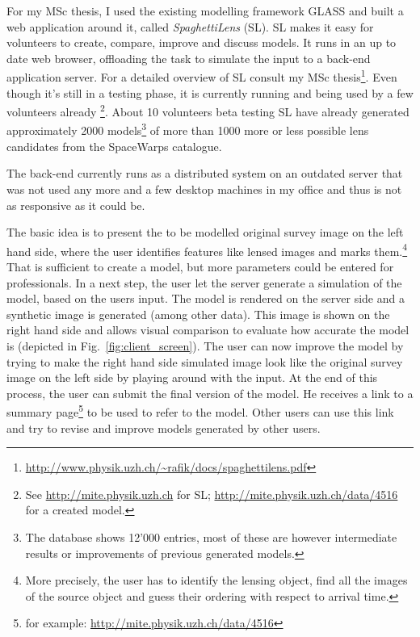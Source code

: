 \documentclass[11pt]{article}
\begin{document}
For my MSc thesis\cite{mscth}, I used the existing modelling framework GLASS\cite{glass} and built a web application around it, called \emph{SpaghettiLens} (SL).
SL makes it easy for volunteers to create, compare, improve and discuss models.
It runs in an up to date web browser, offloading the task to simulate the input to a back-end application server.
For a detailed overview of SL consult my MSc thesis\footnote{\url{http://www.physik.uzh.ch/~rafik/docs/spaghettilens.pdf}}.
Even though it's still in a testing phase, it is currently running and being used by a few volunteers already
\footnote{See \url{http://mite.physik.uzh.ch} for SL; \url{http://mite.physik.uzh.ch/data/4516} for a created model.}.
About 10 volunteers beta testing SL have already generated approximately 2000 models\footnote{The database shows 12'000 entries, most of these are however intermediate results or improvements of previous generated models.} of more than 1000 more or less possible lens candidates from the SpaceWarps catalogue.

The back-end currently runs as a distributed system on an outdated server that was not used any more and a few desktop machines in my office and thus is not as responsive as it could be.

The basic idea is to present the to be modelled original survey image on the left hand side, where the user identifies features like lensed images and marks them.\footnote{More precisely, the user has to identify the lensing object, find all the images of the source object and guess their ordering with respect to arrival time.}
That is sufficient to create a model, but more parameters could be entered for professionals.
In a next step, the user let the server generate a simulation of the model, based on the users input.
The model is rendered on the server side and a synthetic image is generated (among other data).
This image is shown on the right hand side and allows visual comparison to evaluate how accurate the model is (depicted in Fig.~\ref{fig:client_screen}).
The user can now improve the model by trying to make the right hand side simulated image look like the original survey image on the left side by playing around with the input.
At the end of this process, the user can submit the final version of the model.
He receives a link to a summary page\footnote{for example: \url{http://mite.physik.uzh.ch/data/4516}} to be used to refer to the model.
Other users can use this link and try to revise and improve models generated by other users.
\end{document}
